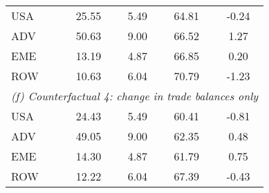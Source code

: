 \begin{table}[p]
\begin{center}
\begin{tabular}{lcccc}
USA& 25.55 & 5.49 & 64.81 & -0.24\\
ADV& 50.63 & 9.00 & 66.52 & 1.27\\
EME& 13.19 & 4.87 & 66.85 & 0.20\\
ROW& 10.63 & 6.04 & 70.79 & -1.23\\
\midrule
\multicolumn{5}{l}{\textit{(f) Counterfactual 4: change in trade balances only}}\\
USA& 24.43 & 5.49 & 60.41 & -0.81\\
ADV& 49.05 & 9.00 & 62.35 & 0.48\\
EME& 14.30 & 4.87 & 61.79 & 0.75\\
ROW& 12.22 & 6.04 & 67.39 & -0.43\\
\bottomrule
\end{tabular}
\normalsize
\end{center}
\end{table}

